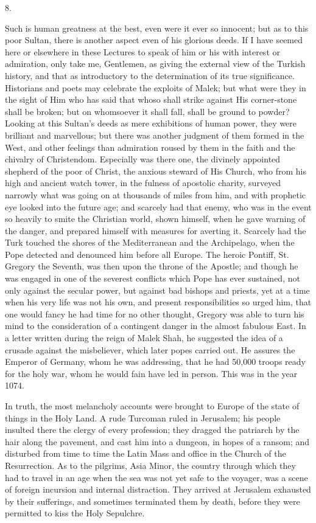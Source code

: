 8.

Such is human greatness at the
best, even were it ever so innocent; but as to this poor Sultan, there
is another aspect even of his glorious deeds. If I have seemed here or
elsewhere in these Lectures to speak of him or his with interest or
admiration, only take me, Gentlemen, as giving the external view of the
Turkish history, and that as introductory to the determination of its
true significance. Historians and poets may celebrate the exploits of
Malek; but what were they in the sight of Him who has said that whoso
shall strike against His corner-stone shall be broken; but on
whomsoever it shall fall, shall be ground to powder? Looking at this
Sultan's deeds as mere exhibitions of human power, they were brilliant
and marvellous; but there was another judgment of them formed in the
West, and other feelings than admiration roused by them in the faith
and the chivalry of Christendom. Especially was there one, the
divinely appointed shepherd of the poor of Christ, the anxious steward
of His Church, who from his high and ancient watch tower, in the
fulness of apostolic charity, surveyed narrowly what was going on at
thousands of miles from him, and with prophetic eye looked into the
future age; and scarcely had that enemy, who was in the event so
heavily to smite the Christian world, shown himself, when he gave
warning of the danger, and prepared himself with measures for averting
it. Scarcely had the Turk touched the shores of the Mediterranean and
the Archipelago, when the Pope detected and denounced him before all
Europe. The heroic Pontiff, St. Gregory the Seventh, was then upon the
throne of the Apostle; and though he was engaged in one of the
severest conflicts which Pope has ever sustained, not only against
the secular power, but against bad bishops and priests, yet at a
time when his very life was not his own, and present responsibilities
so urged him, that one would fancy he had time for no other thought,
Gregory was able to turn his mind to the consideration of a contingent
danger in the almost fabulous East. In a letter written during the
reign of Malek Shah, he suggested the idea of a crusade against the
misbeliever, which later popes carried out. He assures the Emperor of
Germany, whom he was addressing, that he had 50,000 troops ready for
the holy war, whom he would fain have led in person. This was in the
year 1074.

In truth, the most melancholy
accounts were brought to Europe of the state of things in the Holy
Land. A rude Turcoman ruled in Jerusalem; his people insulted there
the clergy of every profession; they dragged the patriarch by the hair
along the pavement, and cast him into a dungeon, in hopes of a ransom;
and disturbed from time to time the Latin Mass and office in the
Church of the Resurrection. As to the pilgrims, Asia Minor, the
country through which they had to travel in an age when the sea was
not yet safe to the voyager, was a scene of foreign incursion and
internal distraction. They arrived at Jerusalem exhausted by their
sufferings, and sometimes terminated them by death, before they were
permitted to kiss the Holy Sepulchre.

